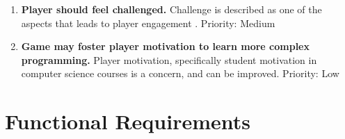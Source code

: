\documentclass[a4paper,11.5pt]{report}
\numberwithin{figure}{section}
\numberwithin{table}{section}
\numberwithin{equation}{section}
\numberwithin{equation}{section}
\begin{document}
\begin{enumerate}[label=3.1.\arabic*]
  \item \textbf{Player should feel challenged.} Challenge is described as one of the aspects that leads to player engagement \citep{whitton2011}. \newline Priority: Medium
  
  \item \textbf{Game may foster player motivation to learn more complex programming.} Player motivation, specifically student motivation in computer science courses is a concern, and can be improved. \newline Priority: Low
  
\end{enumerate}


\section{Functional Requirements}
\end{document}
